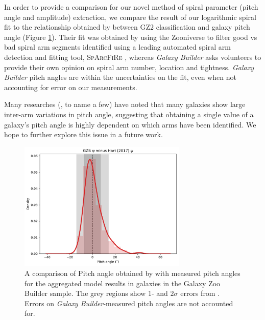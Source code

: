 \documentclass[../main.tex]{subfiles}
\begin{document}
In order to provide a comparison for our novel method of spiral parameter (pitch angle and amplitude) extraction, we compare the result of our logarithmic spiral fit to the relationship obtained by \citet{Hart2016:1607.01019v1} between GZ2 classification and galaxy pitch angle (Figure \ref{fig:hart_pitch_angle}). Their fit was obtained by using the Zooniverse to filter good vs bad spiral arm segments identified using a leading automated spiral arm detection and fitting tool, \textsc{SpArcFiRe} \citep{Davis2014:1402.1910v1}, whereas \textit{Galaxy Builder} asks volunteers to provide their own opinion on spiral arm number, location and tightness. \textit{Galaxy Builder} pitch angles are within the uncertainties on the \citet{Hart2016:1607.01019v1} fit, even when not accounting for error on our measurements.

Many researches (\citealt{Davis2014:1402.1910v1}, \citealt{2019arXiv190804246D} to name a few) have noted that many galaxies show large inter-arm variations in pitch angle, suggesting that obtaining a single value of a galaxy's pitch angle is highly dependent on which arms have been identified. We hope to further explore this issue in a future work.

\begin{figure}
  \includegraphics[width=8cm]{images__results/gzb-hart-comparison.pdf}
  \caption{A comparison of Pitch angle obtained by \citet{Hart2016:1607.01019v1} with measured pitch angles for the aggregated model results in galaxies in the Galaxy Zoo Builder sample. The grey regions show 1- and $2\sigma$ errors from \citet{Hart2016:1607.01019v1}. Errors on \textit{Galaxy Builder}-measured pitch angles are not accounted for.}
  \label{fig:hart_pitch_angle}
\end{figure}
\end{document}
